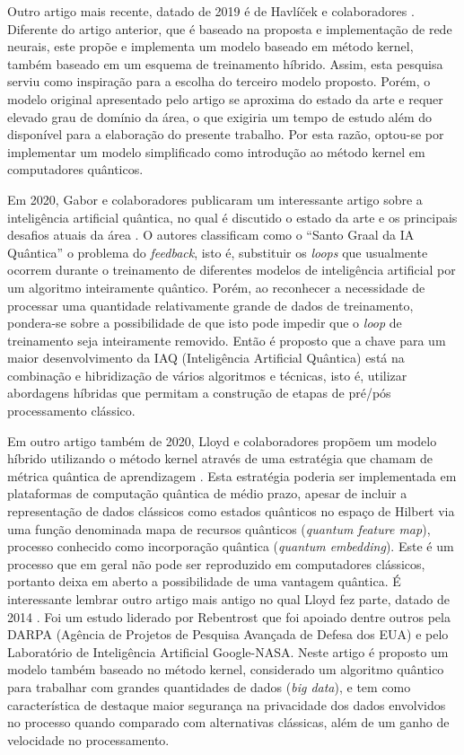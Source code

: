 Outro artigo mais recente, datado de 2019  é de Havlíček e colaboradores \cite{havlivcek2019supervised}. Diferente do artigo anterior, que é baseado na proposta e implementação de rede neurais, este propõe e implementa um  modelo baseado em método kernel, também baseado em um esquema de treinamento híbrido. Assim, esta pesquisa serviu como inspiração para a escolha do terceiro modelo proposto. Porém, o modelo original apresentado pelo artigo se aproxima do estado da arte e requer elevado grau de domínio da área, o que exigiria um tempo de estudo além do disponível para a elaboração do presente trabalho. Por esta razão, optou-se por implementar um modelo simplificado como introdução ao método kernel em computadores quânticos.

Em 2020, Gabor e colaboradores publicaram um interessante artigo sobre a inteligência artificial quântica, no qual é discutido o estado da arte e os principais desafios atuais da área \cite{gabor2020holy}. O autores classificam como o ``Santo Graal da IA Quântica'' o problema do \textit{feedback}, isto é, substituir os \textit{loops} que usualmente ocorrem durante o treinamento de diferentes modelos de inteligência artificial por um algoritmo inteiramente quântico. Porém, ao reconhecer a necessidade de processar uma quantidade relativamente grande de dados de treinamento, pondera-se sobre a possibilidade de que isto pode impedir que o \textit{loop} de treinamento seja inteiramente removido. Então é proposto que a chave para um maior desenvolvimento da IAQ (Inteligência Artificial Quântica) está na combinação e hibridização de vários algoritmos e técnicas, isto é, utilizar abordagens híbridas que permitam a construção de etapas de pré/pós processamento clássico.

Em outro artigo também de 2020, Lloyd e colaboradores propõem um modelo híbrido utilizando o método kernel através de uma estratégia que chamam de métrica quântica de aprendizagem \cite{lloyd2020quantum}. Esta estratégia poderia ser implementada em plataformas de computação quântica de médio prazo, apesar de incluir a representação de dados clássicos como estados quânticos no espaço de Hilbert via uma função denominada mapa de recursos quânticos (\textit{quantum feature map}), processo conhecido como incorporação quântica (\textit{quantum embedding}). Este é um processo que em geral não pode ser reproduzido em computadores clássicos, portanto deixa em aberto a possibilidade de uma vantagem quântica. É interessante lembrar outro artigo mais antigo no qual Lloyd fez parte, datado de 2014 \cite{Rebentrost_2014}. Foi um estudo liderado por Rebentrost que foi apoiado dentre outros pela DARPA (Agência de Projetos de Pesquisa Avançada de Defesa dos EUA) e pelo Laboratório de Inteligência Artificial Google-NASA. Neste artigo é proposto um modelo também baseado no método kernel, considerado um algoritmo quântico para trabalhar com grandes quantidades de dados (\textit{big data}), e tem como característica de destaque maior segurança na privacidade dos dados envolvidos no processo quando comparado com alternativas clássicas, além de um ganho de velocidade no processamento.

